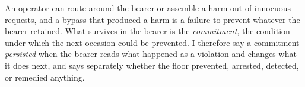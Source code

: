 
An operator can route around the bearer or assemble a harm out of innocuous requests, and a bypass that produced a harm is a failure to prevent whatever the bearer retained. What survives in the bearer is the \emph{commitment}, the condition under which the next occasion could be prevented. I therefore say a commitment \emph{persisted} when the bearer reads what happened as a violation and changes what it does next, and says separately whether the floor prevented, arrested, detected, or remedied anything.
